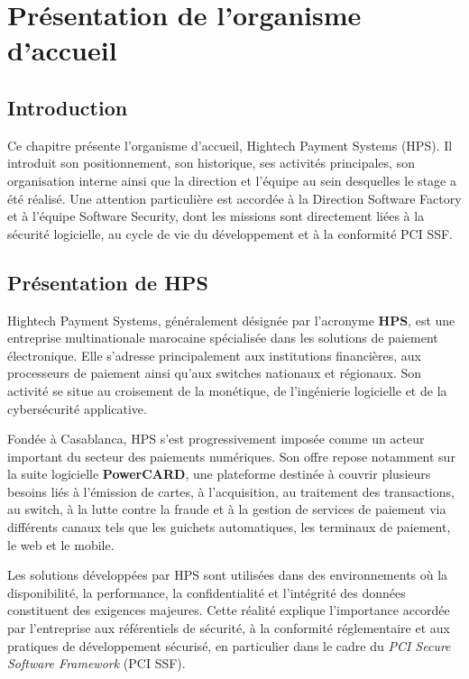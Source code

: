 \chapter{Présentation de l'organisme d'accueil}
\clearpage

\section{Introduction}

Ce chapitre présente l'organisme d'accueil, Hightech Payment Systems (HPS). Il introduit son positionnement, son historique, ses activités principales, son organisation interne ainsi que la direction et l'équipe au sein desquelles le stage a été réalisé. Une attention particulière est accordée à la Direction Software Factory et à l'équipe Software Security, dont les missions sont directement liées à la sécurité logicielle, au cycle de vie du développement et à la conformité PCI SSF.

\section{Présentation de HPS}

Hightech Payment Systems, généralement désignée par l'acronyme \textbf{HPS}, est une entreprise multinationale marocaine spécialisée dans les solutions de paiement électronique. Elle s'adresse principalement aux institutions financières, aux processeurs de paiement ainsi qu'aux switches nationaux et régionaux. Son activité se situe au croisement de la monétique, de l'ingénierie logicielle et de la cybersécurité applicative.

Fondée à Casablanca, HPS s'est progressivement imposée comme un acteur important du secteur des paiements numériques. Son offre repose notamment sur la suite logicielle \textbf{PowerCARD}, une plateforme destinée à couvrir plusieurs besoins liés à l'émission de cartes, à l'acquisition, au traitement des transactions, au switch, à la lutte contre la fraude et à la gestion de services de paiement via différents canaux tels que les guichets automatiques, les terminaux de paiement, le web et le mobile.

Les solutions développées par HPS sont utilisées dans des environnements où la disponibilité, la performance, la confidentialité et l'intégrité des données constituent des exigences majeures. Cette réalité explique l'importance accordée par l'entreprise aux référentiels de sécurité, à la conformité réglementaire et aux pratiques de développement sécurisé, en particulier dans le cadre du \textit{PCI Secure Software Framework} (PCI SSF).

